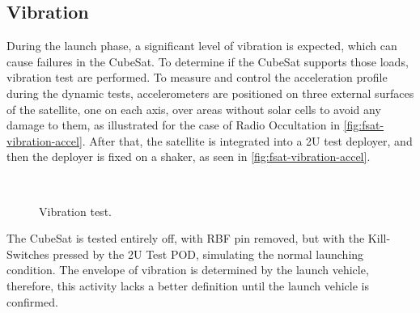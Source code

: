 \subsection{Vibration}

During the launch phase, a significant level of vibration is expected, which can cause failures in the CubeSat. To determine if the CubeSat supports those loads, vibration test are performed. To measure and control the acceleration profile during the dynamic tests, accelerometers are positioned on three external surfaces of the satellite, one on each axis, over areas without solar cells to avoid any damage to them, as illustrated for the case of Radio Occultation in \autoref{fig:fsat-vibration-accel}. After that, the satellite is integrated into a 2U test deployer, and then the deployer is fixed on a shaker, as seen in \autoref{fig:fsat-vibration-accel}.

\begin{figure}[!htb]
    \begin{center}
        ~
        \caption{Vibration test.}
        \label{fig:vibration-test}
    \end{center}
\end{figure}

The CubeSat is tested entirely off, with RBF pin removed, but with the Kill-Switches pressed by the 2U Test POD, simulating the normal launching condition. The envelope of vibration is determined by the launch vehicle, therefore, this activity lacks a better definition until the launch vehicle is confirmed.

